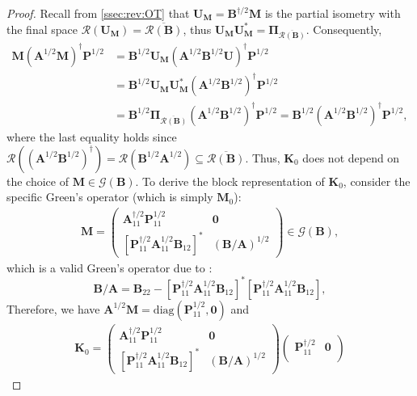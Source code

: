 \documentclass[noinfoline]{imsart}\setcounter{tocdepth}{2}
\newcommand{\m}[1]{\mathbf{#1}}
\renewcommand{\c}[1]{\mathcal{#1}}
\theoremstyle{plain}
\begin{document}
\begin{proof}
Recall from \cref{ssec:rev:OT} that $\m{U}_{\m{M}} = \m{B}^{\dagger/2} \m{M}$ is the partial isometry with the final space $\c{R}(\m{U}_{\m{M}}) = \overline{\c{R}(\m{B})}$, thus $\m{U}_{\m{M}} \m{U}_{\m{M}}^{*} = \m{\Pi}_{\overline{\c{R}(\m{B})}}$. Consequently, 
\begin{align*}
    \m{M} (\m{A}^{1/2} \m{M})^{\dagger} \m{P}^{1/2} &= \m{B}^{1/2} \m{U}_{\m{M}} (\m{A}^{1/2} \m{B}^{1/2} \m{U})^{\dagger} \m{P}^{1/2} \\
    &= \m{B}^{1/2} \m{U}_{\m{M}} \m{U}_{\m{M}}^{*} (\m{A}^{1/2} \m{B}^{1/2})^{\dagger} \m{P}^{1/2} \\
    &= \m{B}^{1/2} \m{\Pi}_{\overline{\c{R}(\m{B})}} (\m{A}^{1/2} \m{B}^{1/2})^{\dagger} \m{P}^{1/2} = \m{B}^{1/2} (\m{A}^{1/2} \m{B}^{1/2})^{\dagger} \m{P}^{1/2},
\end{align*}
where the last equality holds since $\c{R}((\m{A}^{1/2}\m{B}^{1/2})^\dagger) = \c{R}(\m{B}^{1/2}\m{A}^{1/2}) \subseteq \overline{\c{R}(\m{B})}$. Thus, $\m{K}_{0}$ does not depend on the choice of $\m{M} \in \c{G}(\m{B})$. To derive the block representation of $\m{K}_{0}$, consider the specific Green's operator (which is simply $\m{M}_{0}$):
\begin{align*}
    \m{M} = \begin{pmatrix}
    \m{A}_{11}^{\dagger/2} \m{P}_{11}^{1/2} & \m{0} \\
    [\m{P}_{11}^{\dagger/2} \m{A}_{{11}}^{1/2} \m{B}_{{12}}]^{*} & (\m{B}/\m{A})^{1/2}
    \end{pmatrix}  \in \c{G}(\m{B}),
\end{align*}
which is a valid Green's operator due to \cite[Lemma 2.4.]{yun2025gaussian}:
\begin{equation}\label{eq:schur:invar}
        \m{B}/\m{A} = \m{B}_{22} - [\m{P}_{11}^{\dagger/2} \m{A}_{{11}}^{1/2} \m{B}_{{12}}]^{*} [\m{P}_{11}^{\dagger/2} \m{A}_{{11}}^{1/2} \m{B}_{{12}}],
\end{equation}
Therefore, we have $\m{A}^{1/2} \m{M} = \text{diag}(\m{P}_{11}^{1/2}, \m{0})$ and
\begin{align*}
    \m{K}_{0} = \begin{pmatrix}
    \m{A}_{11}^{\dagger/2} \m{P}_{11}^{1/2} & \m{0} \\
    [\m{P}_{11}^{\dagger/2} \m{A}_{{11}}^{1/2} \m{B}_{{12}}]^{*} & (\m{B}/\m{A})^{1/2}
    \end{pmatrix} \begin{pmatrix}
    \m{P}_{11}^{\dagger/2} & \m{0} \\

\end{pmatrix}
\end{align*}
\end{proof}
\end{document}
